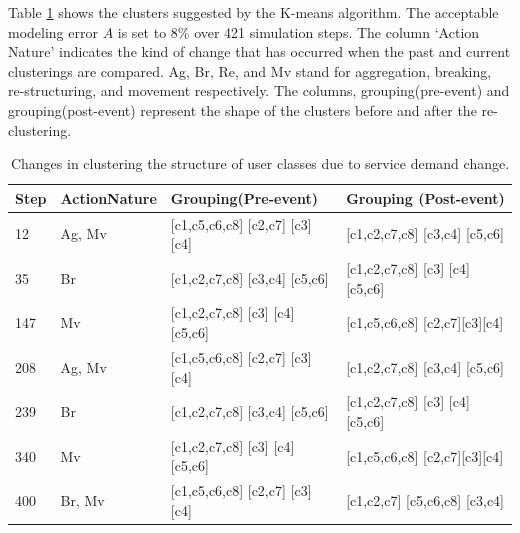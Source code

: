  Table \ref{tab:changes-clustering-structure} shows the clusters suggested by the K-means algorithm. The acceptable modeling error $A$ is set to 8\% over 421 simulation steps. The column `Action Nature' indicates the kind of change that has occurred when the past and current clusterings are compared. Ag, Br, Re, and Mv stand for aggregation, breaking, re-structuring, and movement respectively. The columns, grouping(pre-event) and grouping(post-event) represent the shape of the clusters before and after the re-clustering. %
\begin{table}
	\centering
\begin{tabular}{|p{0.3in}|p{0.8in}|p{2in}|p{2in}|} \hline 
Step & Action\newline Nature & Grouping\newline (Pre-event) & Grouping (Post-event) \\ \hline 
12 & Ag, Mv & [c1,c5,c6,c8] [c2,c7] [c3] [c4] & [c1,c2,c7,c8] [c3,c4]  [c5,c6] \\ \hline 
35 & Br & [c1,c2,c7,c8] [c3,c4] [c5,c6] & [c1,c2,c7,c8] [c3] [c4] [c5,c6] \\ \hline 
147 & Mv & [c1,c2,c7,c8] [c3] [c4] [c5,c6] & [c1,c5,c6,c8] [c2,c7][c3][c4] \\ \hline 
208 & Ag, Mv & [c1,c5,c6,c8] [c2,c7] [c3] [c4] & [c1,c2,c7,c8] [c3,c4] [c5,c6] \\ \hline 
239 & Br & [c1,c2,c7,c8] [c3,c4] [c5,c6] & [c1,c2,c7,c8] [c3] [c4] [c5,c6] \\ \hline 
340 & Mv & [c1,c2,c7,c8] [c3] [c4] [c5,c6] & [c1,c5,c6,c8] [c2,c7][c3][c4] \\ \hline 
400 & Br, Mv & [c1,c5,c6,c8] [c2,c7] [c3] [c4] & [c1,c2,c7] [c5,c6,c8] [c3,c4] \\ \hline 
\end{tabular}
	\caption[Changes in clustering the structure of user classes due to service demand change.]{Changes in clustering the structure of user classes due to service demand change.}
	\label{tab:changes-clustering-structure}  
\end{table}


